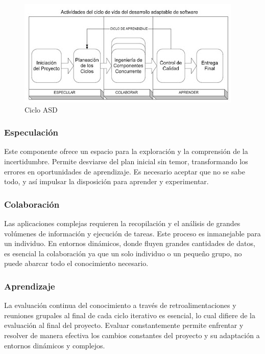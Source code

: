 \documentclass[
  12pt,
  openany]{book}
\begin{document}
\begin{figure}

{\centering \includegraphics[width=0.6\linewidth]{images/04-metodologia/02_ciclo} 

}

\caption{Ciclo ASD}\label{fig:metdas}
\end{figure}

\hypertarget{especulaciuxf3n}{%
\subsubsection{\texorpdfstring{\textbf{Especulación}}{Especulación}}\label{especulaciuxf3n}}

Este componente ofrece un espacio para la exploración y la comprensión de la incertidumbre. Permite desviarse del plan inicial sin temor, transformando los errores en oportunidades de aprendizaje. Es necesario aceptar que no se sabe todo, y así impulsar la disposición para aprender y experimentar.

\hypertarget{colaboraciuxf3n}{%
\subsubsection{\texorpdfstring{\textbf{Colaboración}}{Colaboración}}\label{colaboraciuxf3n}}

Las aplicaciones complejas requieren la recopilación y el análisis de grandes volúmenes de información y ejecución de tareas. Este proceso es inmanejable para un individuo. En entornos dinámicos, donde fluyen grandes cantidades de datos, es esencial la colaboración ya que un solo individuo o un pequeño grupo, no puede abarcar todo el conocimiento necesario.

\hypertarget{aprendizaje}{%
\subsubsection{\texorpdfstring{\textbf{Aprendizaje}}{Aprendizaje}}\label{aprendizaje}}

La evaluación continua del conocimiento a través de retroalimentaciones y reuniones grupales al final de cada ciclo iterativo es esencial, lo cual difiere de la evaluación al final del proyecto. Evaluar constantemente permite enfrentar y resolver de manera efectiva los cambios constantes del proyecto y su adaptación a entornos dinámicos y complejos.
\end{document}
